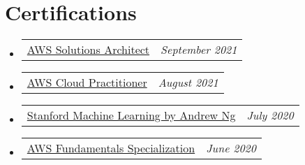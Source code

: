\documentclass[letterpaper,11pt]{article}
\makeatletter
\newcommand{\certItem}[2]{
	\vspace{-1pt}\item[]
	\begin{tabular*}{0.96\textwidth}{l@{\extracolsep{\fill}}r}
		#1 & \textit{\small #2} \\
	\end{tabular*}\vspace{-7pt}
}
\newcommand{\resumeSubHeadingListStart}{\begin{itemize}[leftmargin=1mm]}
\newcommand{\resumeSubHeadingListEnd}{\end{itemize}}
\makeatother
\begin{document}
\section{Certifications}
\resumeSubHeadingListStart{}
\certItem{\href{https://www.credly.com/badges/ef46fdf4-2c55-474d-a963-9ee14107160f}{AWS Solutions Architect}}
{September 2021}
\certItem{\href{https://www.credly.com/badges/c8d7f47f-c6c1-4af9-8391-5b509b92b271}{AWS Cloud Practitioner}}
{August 2021}
\certItem{\href{https://coursera.org/share/29802cca497e8680b26b241d0ef50b59}{Stanford Machine Learning by Andrew Ng}}
{July 2020}
\certItem{\href{https://coursera.org/share/daef661212dab251985d69e4fb71f730}{AWS Fundamentals Specialization}}
{June 2020}
\resumeSubHeadingListEnd{}

\end{document}
